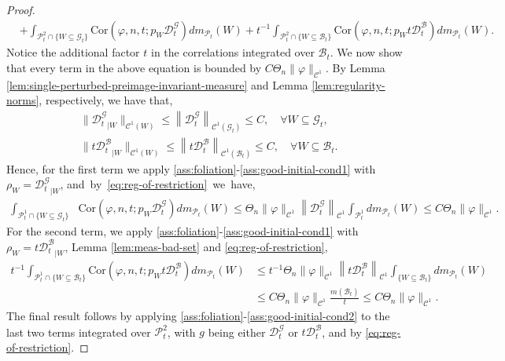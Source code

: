 \documentclass{amsart}
\numberwithin{equation}{section}
\newcommand\vf{\varphi}
\renewcommand{\le}{\leqslant}
\newcommand\cB{{\mathcal B}}
\newcommand\cC{{\mathcal C}}
\newcommand\cD{{\mathcal D}}
\newcommand\cG{{\mathcal G}}
\newcommand{\Deriv}{\mathcal D}
\newcommand{\cov}{ \text{Cor} }
\begin{document}
\begin{proof}
\[\begin{split}
 &+\int_{\mathscr P_t^{2} \cap \{W \subseteq \cG_t\}}\!\!\!\!\!\!\!\!\!\!\!\!\!\!\!\! \!\!\!\!\cov(\vf, n, t; p_W  \Deriv_t^{\cG})dm_{\mathscr P_t}(W)  +t^{-1} \int_{\mathscr P_t^{2} \cap \{W \subseteq \cB_t\}}\!\!\!\!\!\!\!\!\!\!\!\!\!\!\!\!\!\!\!\!\!\!\!\! \cov(\vf, n, t; p_W t \Deriv_t^{\cB}) dm_{\mathscr P_t}(W).
\end{split}
\]
Notice the additional factor \(t\) in the correlations integrated over \(\cB_t\). We now show that every term in the above equation is bounded by \(C \Theta_n\|\vf\|_{\cC^1}\). By Lemma \ref{lem:single-perturbed-preimage-invariant-measure} and Lemma \ref{lem:regularity-norms}, respectively, we have that,
\begin{equation}\label{eq:reg-of-restriction}
\begin{split}
&\bigl\|{\cD_{t}^{\cG}}_{|W}\bigr\|_{\cC^1(W)}\le \left\|{\cD_{t}^{\cG}}\right\|_{\cC^1(\cG_t)}\le C, \quad \forall W \subseteq \cG_t, \\
& \bigl\|t{\cD_{t}^{\cB}}_{|W}\bigr\|_{\cC^1(W)} \le \left\| {t \cD_{t}^{\cB}} \right\|_{\cC^1(\cB_t)} \le C, \quad \forall W \subseteq \cB_t.
\end{split}
\end{equation}
Hence, for the first term we apply \ref{ass:foliation}-\ref{ass:good-initial-cond1} with \(\rho_W \!\!=\!\! {\Deriv_t^{\cG}}_{|W}\), \mbox{and by \eqref{eq:reg-of-restriction} we have,}
\[
\begin{split}
 \int_{\mathscr P_t^{1} \cap \{W \subseteq \cG_t\}}&\!\!\!\!\!\!\!\!\!\!\!\!\!\!\!\!\!\!\!\! \!\!\!\! \cov(\vf, n, t; p_W  \Deriv_t^{\cG}) dm_{\mathscr P_t}(W) \le \Theta_n \|\vf\|_{\cC^1} \left\|\Deriv_t^{\cG}\right\|_{\cC^1} \int_{\mathscr P_t^{1}} dm_{\mathscr P_t}(W) \le C \Theta_n\|\vf\|_{\cC^1}.
\end{split}
\]
For the second term, we apply \ref{ass:foliation}-\ref{ass:good-initial-cond1} with \(\rho_W \!\!=\!\! t{\Deriv_t^{\cB}}_{|W}\), Lemma \ref{lem:meas-bad-set} and \eqref{eq:reg-of-restriction},
\[
\begin{split}
   t^{-1} \int_{\mathscr P_t^{1} \cap \{W \subseteq \cB_t\}}\!\!\!\!\!\!\!\!\!\!\!\!\!\!\!\!\!\!\!\!\!\!\!\! \cov(\vf, n, t;  p_W t \Deriv_t^{\cB}) dm_{\mathscr P_t}(W) & \le t^{-1} \Theta_n \|\vf\|_{\cC^1} \left\|t\Deriv_t^{\cB}\right\|_{\cC^1}  \int_{\{W \subseteq \cB_t\}}dm_{\mathscr P_t}(W) \\
&\le C \Theta_n \|\vf\|_{\cC^1} \frac{m \left( \cB_t\right)}{t} \le C \Theta_n \|\vf\|_{\cC^1}.
\end{split}
\]
The final result follows by applying \ref{ass:foliation}-\ref{ass:good-initial-cond2} to the last two terms integrated over \(\mathscr P_t^2\), with \(g\) being either \(\Deriv_t^{\cG}\) or \(t\Deriv_t^{\cB}\), and by \eqref{eq:reg-of-restriction}.
\end{proof}
\end{document}
